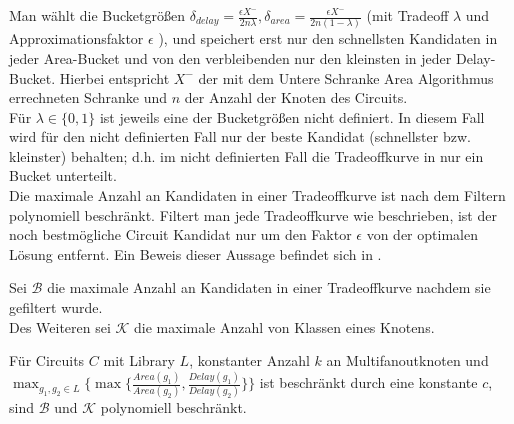 \documentclass[11pt, a4paper, german]{article}
\begin{document}
Man wählt die Bucketgrößen $\delta_{delay} = \frac{\epsilon X^{-}}{2n\lambda}, \delta_{area} = \frac{\epsilon X^{-}}{2n(1-\lambda)}$ (mit Tradeoff $\lambda$ und Approximationsfaktor $\epsilon$ ), und speichert erst nur den schnellsten Kandidaten in jeder Area-Bucket und von den verbleibenden nur den kleinsten in jeder Delay-Bucket. Hierbei entspricht $X^-$ der mit dem Untere Schranke Area Algorithmus errechneten Schranke und $n$ der Anzahl der Knoten des Circuits. \\
Für $\lambda \in \{ 0,1 \}$ ist jeweils eine der Bucketgrößen nicht definiert. In diesem Fall wird für den nicht definierten Fall nur der beste Kandidat (schnellster bzw. kleinster) behalten; d.h. im nicht definierten Fall die Tradeoffkurve in nur ein Bucket unterteilt.\\
Die maximale Anzahl an Kandidaten in einer Tradeoffkurve ist nach dem Filtern polynomiell beschränkt. 
Filtert man jede Tradeoffkurve wie beschrieben, ist der noch bestmögliche Circuit Kandidat nur um den Faktor $\epsilon$ von der optimalen Lösung entfernt. Ein Beweis dieser Aussage befindet sich in \cite{Elbert}.
\begin{definition}
Sei $\mathcal{B}$ die maximale Anzahl an Kandidaten in einer Tradeoffkurve nachdem sie gefiltert wurde.\\
Des Weiteren sei $\mathcal{K}$ die maximale Anzahl von Klassen eines Knotens.
\end{definition}
\begin{cor}\label{cor:anzahl_klassen}
Für Circuits $C$ mit Library $L$, konstanter Anzahl $k$ an Multifanoutknoten und $\max_{g_1,g_2 \in L} \{ \max \{\frac{Area(g_1)}{Area(g_2)},\frac{Delay(g_1)}{Delay(g_2)}\}\} $ ist beschränkt durch eine konstante $c$, sind $\mathcal{B}$ und $\mathcal{K}$ polynomiell beschränkt.
\end{cor}
\end{document}

